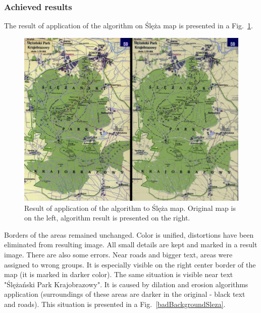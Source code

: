\documentclass[a4paper,onecolumn,oneside,12pt]{memoir}
\begin{document}
\subsubsection{Achieved results}

The result of application of the algorithm on Ślęża map is presented in a Fig.~\ref{resultSlezaIO}.

\begin{figure}[!ht]
\begin{center}
\includegraphics[scale=1.5]{images/resultSlezaIO.jpeg}
\caption{Result of application of the algorithm to Ślęża map. Original map is on the left, algorithm
result is presented on the right.}
\label{resultSlezaIO}
\end{center}
\end{figure}

Borders of the areas remained unchanged. Color is unified, distortions have been eliminated from
resulting image. All small details are kept and marked in a result image. There are also some 
errors. Near roads and bigger text, areas were assigned to wrong groups. It is especially visible on
the right center border of the map (it is marked in darker color). The same situation is visible
near text "Ślężański Park Krajobrazowy". It is caused by dilation and erosion algorithms application
 (surroundings of these areas are darker in the original - black text and roads). This situation is
presented in a Fig.~\ref{badBackgroundSleza}. 
\end{document}
